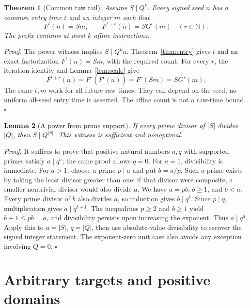 \documentclass[11pt,letterpaper]{article}
\newcommand{\N}{\mathbb{N}}
\newtheorem{theorem}{Theorem}
\newtheorem{lemma}[theorem]{Lemma}
\newenvironment{proof}{\noindent\textit{Proof.}}{\hfill\(\square\)}
\begin{document}
\begin{theorem}[Common raw tail]
\label{thm:tail}
Assume \(S\mid Q^k\). Every signed seed \(n\) has a common entry time
\(t\) and an integer \(m\) such that
\[
F^t(n)=Sm,\qquad F^{t+r}(n)=S G^r(m)\quad(r\in\N).
\]
The prefix contains at most \(k\) affine instructions.
\end{theorem}
\begin{proof}
The power witness implies \(S\mid Q^k n\). Theorem~\ref{thm:entry}
gives \(t\) and an exact factorization \(F^t(n)=Sm\), with the required
count. For every \(r\), the iteration identity and Lemma~\ref{lem:scale}
give
\[
F^{t+r}(n)=F^r(F^t(n))=F^r(Sm)=S G^r(m).
\]
The same \(t,m\) work for all future raw times. They can depend on the
seed; no uniform all-seed entry time is asserted. The affine count is not
a raw-time bound.
\end{proof}

\begin{lemma}[A power from prime support]
\label{lem:support}
If every prime divisor of \(|S|\) divides \(|Q|\), then
\(S\mid Q^{|S|}\). This witness is sufficient and nonoptimal.
\end{lemma}
\begin{proof}
It suffices to prove that positive natural numbers \(a,q\) with supported
primes satisfy \(a\mid q^a\); the same proof allows \(q=0\).
For \(a=1\), divisibility is immediate. For \(a>1\), choose a prime
\(p\mid a\) and put \(b=a/p\). Such a prime exists by taking the least
divisor greater than one: if that divisor were composite, a smaller
nontrivial divisor would also divide \(a\).
We have \(a=pb\), \(b\ge1\), and \(b<a\). Every prime divisor of \(b\)
also divides \(a\), so induction gives \(b\mid q^b\). Since \(p\mid q\),
multiplication gives \(a\mid q^{b+1}\). The inequalities
\(p\ge2\) and \(b\ge1\) yield \(b+1\le pb=a\), and divisibility
persists upon increasing the exponent. Thus \(a\mid q^a\).
Apply this to \(a=|S|\), \(q=|Q|\), then use absolute-value divisibility
to recover the signed integer statement. The exponent-zero unit case also
avoids any exception involving \(Q=0\).
\end{proof}

\section{Arbitrary targets and positive domains}
\end{document}
